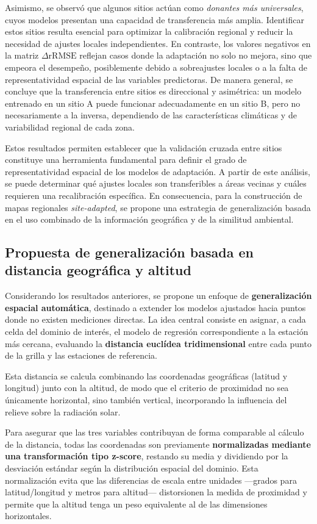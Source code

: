 Asimismo, se observó que algunos sitios actúan como \textit{donantes más universales}, cuyos modelos presentan una capacidad de transferencia más amplia. Identificar estos sitios resulta esencial para optimizar la calibración regional y reducir la necesidad de ajustes locales independientes. En contraste, los valores negativos en la matriz $\Delta \text{rRMSE}$ reflejan casos donde la adaptación no solo no mejora, sino que empeora el desempeño, posiblemente debido a sobreajustes locales o a la falta de representatividad espacial de las variables predictoras. De manera general, se concluye que la transferencia entre sitios es direccional y asimétrica: un modelo entrenado en un sitio A puede funcionar adecuadamente en un sitio B, pero no necesariamente a la inversa, dependiendo de las características climáticas y de variabilidad regional de cada zona.

Estos resultados permiten establecer que la validación cruzada entre sitios constituye una herramienta fundamental para definir el grado de representatividad espacial de los modelos de adaptación. A partir de este análisis, se puede determinar qué ajustes locales son transferibles a áreas vecinas y cuáles requieren una recalibración específica. En consecuencia, para la construcción de mapas regionales \textit{site-adapted}, se propone una estrategia de generalización basada en el uso combinado de la información geográfica y de la similitud ambiental.

\subsection*{Propuesta de generalización basada en distancia geográfica y altitud}

Considerando los resultados anteriores, se propone un enfoque de \textbf{generalización espacial automática}, destinado a extender los modelos ajustados hacia puntos donde no existen mediciones directas. La idea central consiste en asignar, a cada celda del dominio de interés, el modelo de regresión correspondiente a la estación más cercana, evaluando la \textbf{distancia euclídea tridimensional} entre cada punto de la grilla y las estaciones de referencia. 

Esta distancia se calcula combinando las coordenadas geográficas (latitud y longitud) junto con la altitud, de modo que el criterio de proximidad no sea únicamente horizontal, sino también vertical, incorporando la influencia del relieve sobre la radiación solar. 

Para asegurar que las tres variables contribuyan de forma comparable al cálculo de la distancia, todas las coordenadas son previamente \textbf{normalizadas mediante una transformación tipo z-score}, restando su media y dividiendo por la desviación estándar según la distribución espacial del dominio. Esta normalización evita que las diferencias de escala entre unidades —grados para latitud/longitud y metros para altitud— distorsionen la medida de proximidad y permite que la altitud tenga un peso equivalente al de las dimensiones horizontales. 

